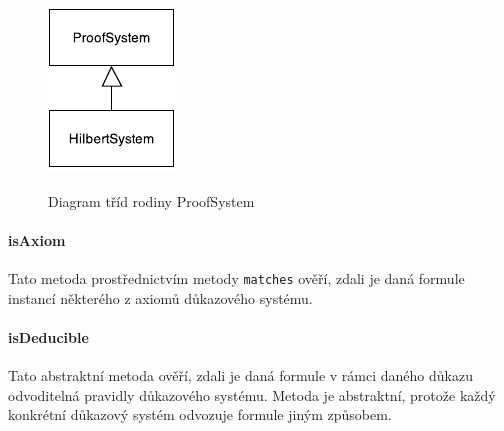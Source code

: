 \documentclass[thesis=B,czech,hidelinks]{thesis}[2012/06/26]
\begin{document}
\begin{figure}
\centering
\caption{Diagram tříd rodiny ProofSystem}
\includegraphics[width=\linewidth]{diagrams/proof_system}
\label{fig:proof_system}
\end{figure}

\paragraph{isAxiom}

Tato metoda prostřednictvím metody \texttt{matches} ověří, zdali je daná formule instancí některého z axiomů důkazového systému.

\paragraph{isDeducible}

Tato abstraktní metoda ověří, zdali je daná formule v rámci daného důkazu odvoditelná pravidly důkazového systému. Metoda je abstraktní, protože každý konkrétní důkazový systém odvozuje formule jiným způsobem.
\end{document}
